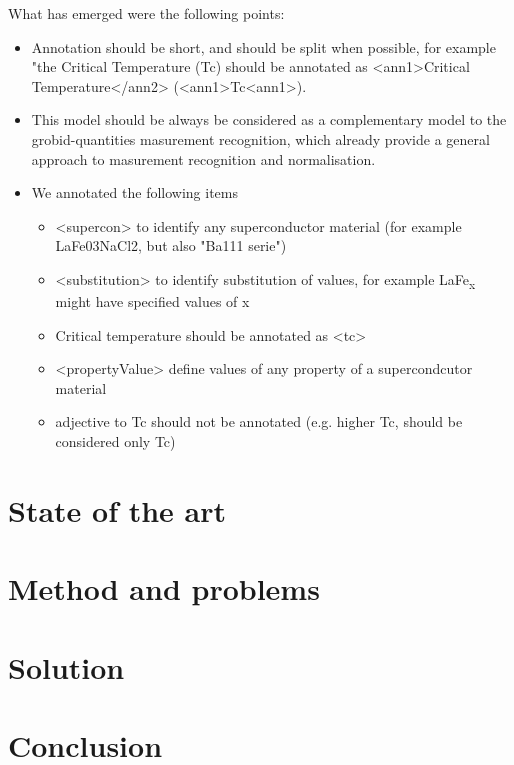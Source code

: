 \documentclass{article}
\begin{document}
What has emerged were the following points: 
\begin{itemize}
    \item Annotation should be short, and should be split when possible, for example "the Critical Temperature (Tc) should be annotated as <ann1>Critical Temperature</ann2> (<ann1>Tc<ann1>). 
    \item This model should be always be considered as a complementary model to the grobid-quantities masurement recognition, which already provide a general approach to masurement recognition and normalisation. 

    \item We annotated the following items
    \begin{itemize}
        \item <supercon> to identify any superconductor material (for example LaFe03NaCl2, but also "Ba111 serie")
        \item <substitution> to identify substitution of values, for example LaFe\textsubscript{x} might have specified values of x 
        \item Critical temperature should be annotated as <tc>
        \item <propertyValue> define values of any property of a supercondcutor material 
        \item adjective to Tc should not be annotated (e.g. higher Tc, should be considered only Tc)
    \end{itemize}
\end{itemize}





\section{State of the art} 

\section{Method and problems}

\section{Solution}

\section{Conclusion}

\listoffigures



\end{document}
